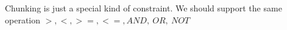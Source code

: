 Chunking is just a special kind of constraint. We should support the same operation $>, <, >=, <=, AND,\ OR,\ NOT$